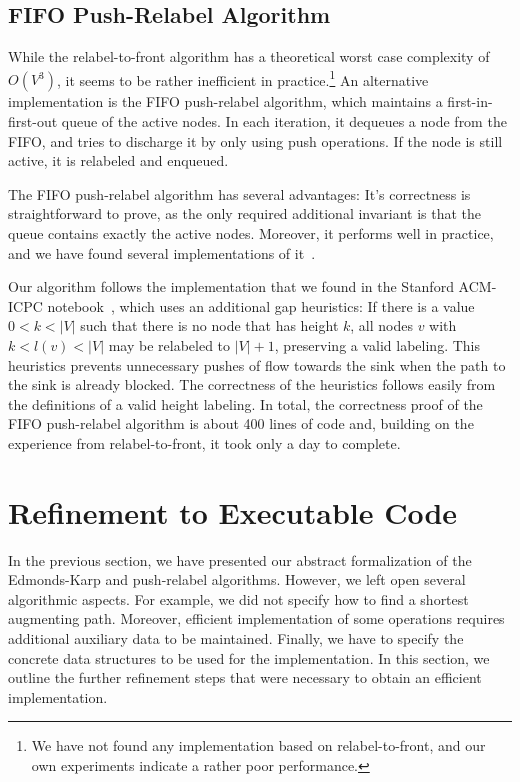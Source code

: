 \documentclass[smallcondensed]{svjour3}     %
\begin{document}
\subsection{FIFO Push-Relabel Algorithm}
While the relabel-to-front algorithm has a theoretical worst case complexity of $O(V^3)$, it seems to be rather inefficient in practice.\footnote{We have not found any implementation based on relabel-to-front, and our own experiments indicate a rather poor performance.}
An alternative implementation is the FIFO push-relabel algorithm, which maintains a first-in-first-out queue of the active nodes. 
In each iteration, it dequeues a node from the FIFO, and tries to discharge it by only using push operations.
If the node is still active, it is relabeled and enqueued.


The FIFO push-relabel algorithm has several advantages: It's correctness is straightforward to prove, 
as the only required additional invariant is that the queue contains exactly the active nodes. 
Moreover, it performs well in practice, and we have found several implementations of it~\cite{ChGo97,ICPC-notebook}.

Our algorithm follows the implementation that we found in the Stanford ACM-ICPC notebook~\cite{ICPC-notebook}, 
which uses an additional gap heuristics: If there is a value $0<k<|V|$ such that there is no node that has height $k$, 
all nodes $v$ with $k<l(v)<|V|$ may be relabeled to $|V|+1$, preserving a valid labeling. 
This heuristics prevents unnecessary pushes of flow towards the sink when the path to the sink is already blocked.
The correctness of the heuristics follows easily from the definitions of a valid height labeling.
In total, the correctness proof of the FIFO push-relabel algorithm is about 400 lines of code and, building on the experience from relabel-to-front, it 
took only a day to complete.

  
    
\section{Refinement to Executable Code}\label{sec:executable}
  In the previous section, we have presented our abstract formalization of the Edmonds-Karp and push-relabel algorithms.
  However, we left open several algorithmic aspects. For example, we did not specify how to find a shortest augmenting path.
  Moreover, efficient implementation of some operations requires additional auxiliary data to be maintained. 
  Finally, we have to specify the concrete data structures to be used for the implementation. 
  In this section, we outline the further refinement steps that were necessary to obtain an efficient implementation.
\end{document}
